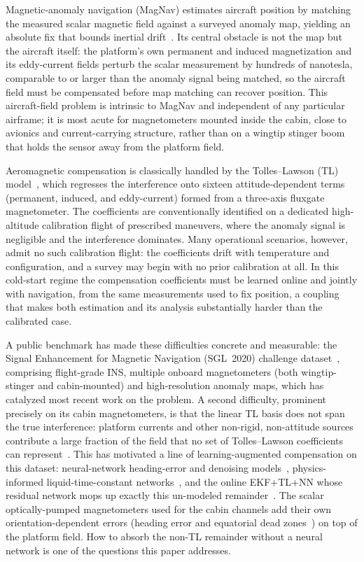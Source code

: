\documentclass{IEEEtaes}
\begin{document}
Magnetic-anomaly navigation (MagNav) estimates aircraft position by matching the
measured scalar magnetic field against a surveyed anomaly map, yielding an
absolute fix that bounds inertial drift~\cite{canciani2017}. Its central obstacle
is not the map but the aircraft itself: the platform's own permanent and induced
magnetization and its eddy-current fields perturb the scalar measurement by
hundreds of nanotesla, comparable to or larger than the anomaly signal being
matched, so the aircraft field must be compensated before map matching can
recover position. This aircraft-field problem is intrinsic to MagNav and
independent of any particular airframe; it is most acute for magnetometers
mounted inside the cabin, close to avionics and current-carrying structure,
rather than on a wingtip stinger boom that holds the sensor away from the platform
field.

Aeromagnetic compensation is classically handled by the Tolles--Lawson (TL)
model~\cite{tolles1950}, which regresses the interference onto sixteen
attitude-dependent terms (permanent, induced, and eddy-current) formed from a
three-axis fluxgate magnetometer. The coefficients are conventionally identified
on a dedicated high-altitude calibration flight of prescribed maneuvers, where the
anomaly signal is negligible and the interference dominates. Many operational
scenarios, however, admit no such calibration flight: the coefficients drift with
temperature and configuration, and a survey may begin with no prior calibration at
all. In this cold-start regime the compensation coefficients must be learned
online and jointly with navigation, from the same measurements used to fix
position, a coupling that makes both estimation and its analysis substantially
harder than the calibrated case.

A public benchmark has made these difficulties concrete and measurable: the Signal
Enhancement for Magnetic Navigation (SGL~2020) challenge dataset~\cite{gnadt2020},
comprising flight-grade INS, multiple onboard magnetometers (both wingtip-stinger
and cabin-mounted) and high-resolution anomaly maps, which has catalyzed most
recent work on the problem. A second difficulty, prominent precisely on its cabin
magnetometers, is that the linear TL basis does not span the true interference:
platform currents and other non-rigid, non-attitude sources contribute a large
fraction of the field that no set of Tolles--Lawson
coefficients can represent~\cite{gnadt2022}. This has motivated a line of
learning-augmented compensation on this dataset: neural-network heading-error and
denoising models~\cite{williams1993,gnadt2022}, physics-informed
liquid-time-constant networks~\cite{nerrise2024}, and the online EKF+TL+NN whose
residual network mops up exactly this un-modeled remainder~\cite{hager2026}. The
scalar optically-pumped magnetometers used for the cabin channels add their own
orientation-dependent errors (heading error and equatorial dead
zones~\cite{hager2026b,wang2020}) on top of the platform field. How to absorb the
non-TL remainder without a neural network is one of the questions this paper
addresses.
\end{document}
